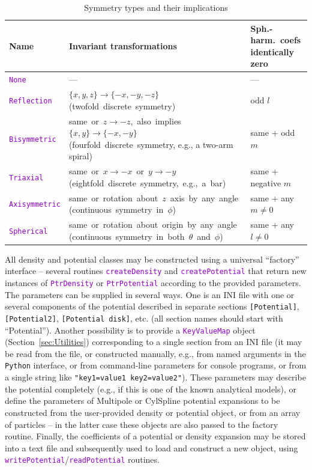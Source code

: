 \documentclass[12pt]{article}
\newcommand{\Python}{\texttt{Python}\xspace}
\newcommand{\ttt}[1]{\textcolor{darkviolet}{\texttt{#1}}}
\newcommand{\ppp}[1]{\textcolor{darkolive} {\texttt{#1}}}
\begin{document}
\begin{table}
\caption{Symmetry types and their implications}  \label{tab:Symmetry}
\renewcommand{\arraystretch}{1.25}
\begin{tabular}{l m{9.2cm} m{3.5cm}}
Name & Invariant transformations & \mbox{Sph.-harm.~coefs} identically zero \\
\hline
\ttt{None} & --- & --- \\[2mm]
\ttt{Reflection} & \mbox{$\{x,y,z\} \to \{-x,-y,-z\}$} \mbox{(twofold discrete symmetry)} & odd $l$ \\
\ttt{Bisymmetric} & \mbox{same or $z \to -z$, also implies $\{x,y\} \to \{-x,-y\}$} \mbox{(fourfold discrete symmetry}, e.g., a two-arm spiral) & same + odd $m$ \\
\ttt{Triaxial} & \mbox{same or $x \to -x$ or $y \to -y$} \mbox{(eightfold discrete symmetry, e.g., a bar)} & same + negative $m$ \\
\ttt{Axisymmetric} & \mbox{same or rotation about $z$ axis by any angle} \mbox{(continuous symmetry in $\phi$)} & same + any $m \ne 0$ \\
\ttt{Spherical} & \mbox{same or rotation about origin by any angle} \mbox{(continuous symmetry in both $\theta$ and $\phi$)} & same + any $l \ne 0$
\end{tabular}
\end{table}

All density and potential classes may be constructed using a universal ``factory'' interface -- several routines \ttt{createDensity} and \ttt{createPotential} that return new instances of \ttt{PtrDensity} or \ttt{PtrPotential} according to the provided parameters.
The parameters can be supplied in several ways. One is an INI file with one or several components of the potential described in separate sections \ppp{[Potential]}, \ppp{[Potential2]}, \ppp{[Potential disk]}, etc. (all section names should start with ``Potential''). Another possibility is to provide a \ttt{KeyValueMap} object (Section~\ref{sec:Utilities}) corresponding to a single section from an INI file (it may be read from the file, or constructed manually, e.g., from named arguments in the \Python interface, or from command-line parameters for console programs, or from a single string like \ppp{"key1=value1 key2=value2"}). These parameters may describe the potential completely (e.g., if this is one of the known analytical models), or define the parameters of Multipole or CylSpline potential expansions to be constructed from the user-provided density or potential object, or from an array of particles -- in the latter case these objects are also passed to the factory routine. Finally, the coefficients of a potential or density expansion may be stored into a text file and subsequently used to load and construct a new object, using \ttt{writePotential}/\ttt{readPotential} routines.
\end{document}
